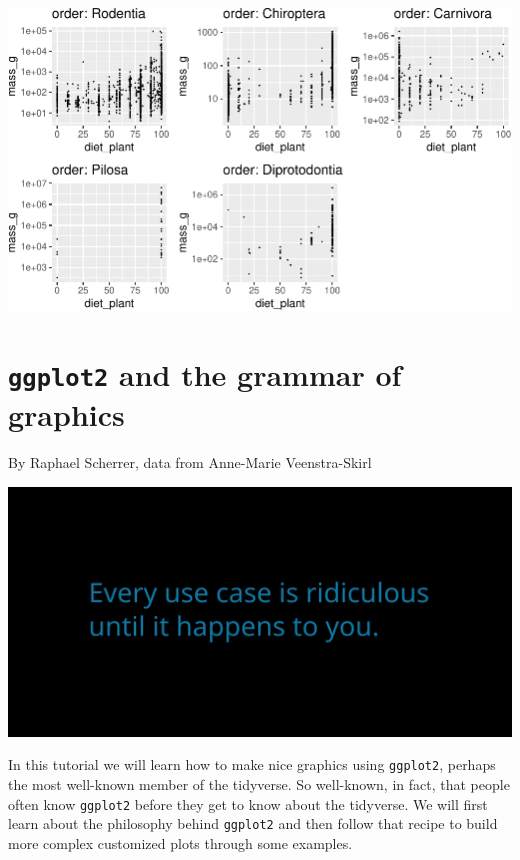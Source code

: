 \documentclass[]{book}
\begin{document}
\begin{center}\includegraphics[width=\textwidth]{TRES-Tidy-Tutorial_files/figure-latex/unnamed-chunk-104-1} \end{center}

\hypertarget{ggplot2-and-the-grammar-of-graphics}{%
\chapter{\texorpdfstring{\texttt{ggplot2} and the grammar of graphics}{ggplot2 and the grammar of graphics}}\label{ggplot2-and-the-grammar-of-graphics}}

By Raphael Scherrer, data from Anne-Marie Veenstra-Skirl

\includegraphics{opening-image.png}

In this tutorial we will learn how to make nice graphics using \texttt{ggplot2}, perhaps the most well-known member of the tidyverse. So well-known, in fact, that people often know \texttt{ggplot2} before they get to know about the tidyverse. We will first learn about the philosophy behind \texttt{ggplot2} and then follow that recipe to build more complex customized plots through some examples.
\end{document}
